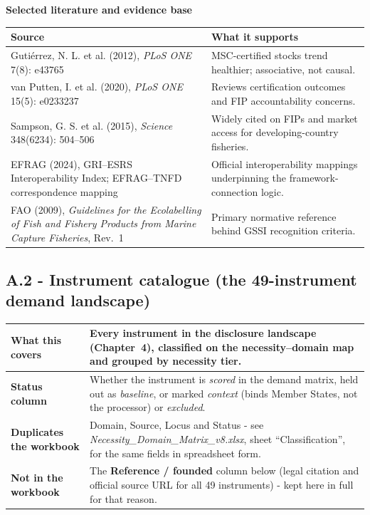 \vspace{6pt}
\noindent\textbf{Selected literature and evidence base}
\vspace{2pt}

\footnotesize
\begin{xltabular}{\textwidth}{@{} p{5.0cm} X @{}}
\toprule \textbf{Source} & \textbf{What it supports} \\ \midrule \endhead
Guti\'errez, N. L. et al. (2012), \emph{PLoS ONE} 7(8): e43765 & MSC-certified
stocks trend healthier; associative, not causal. \\
van Putten, I. et al. (2020), \emph{PLoS ONE} 15(5): e0233237 & Reviews
certification outcomes and FIP accountability concerns. \\
Sampson, G. S. et al. (2015), \emph{Science} 348(6234): 504--506 & Widely cited on
FIPs and market access for developing-country fisheries. \\
EFRAG (2024), GRI--ESRS Interoperability Index; EFRAG--TNFD correspondence mapping
& Official interoperability mappings underpinning the framework-connection logic. \\
FAO (2009), \emph{Guidelines for the Ecolabelling of Fish and Fishery Products from
Marine Capture Fisheries}, Rev.~1 & Primary normative reference behind GSSI
recognition criteria. \\
\bottomrule
\end{xltabular}
\normalsize

\clearpage
\subsection*{A.2 - Instrument catalogue (the 49-instrument demand landscape)}

\begin{tabularx}{\textwidth}{@{} >{\bfseries}p{3.4cm} X @{}}
\toprule
What this covers & Every instrument in the disclosure landscape (Chapter~4), classified on the necessity--domain map and grouped by necessity tier. \\
\midrule
Status column & Whether the instrument is \emph{scored} in the demand matrix, held out as \emph{baseline}, or marked \emph{context} (binds Member States, not the processor) or \emph{excluded}. \\
\midrule
Duplicates the workbook & Domain, Source, Locus and Status - see \emph{Necessity\_Domain\_Matrix\_v8.xlsx}, sheet ``Classification'', for the same fields in spreadsheet form. \\
\midrule
Not in the workbook & The \textbf{Reference / founded} column below (legal citation and official source URL for all 49 instruments) - kept here in full for that reason. \\
\bottomrule
\end{tabularx}


